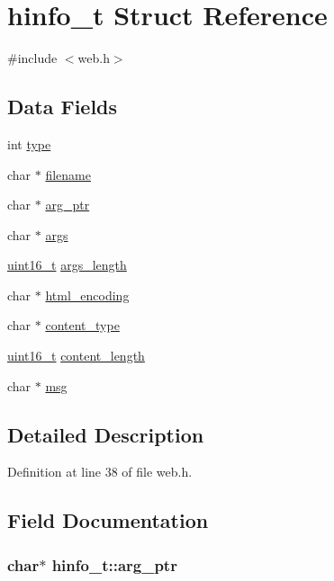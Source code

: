 \hypertarget{structhinfo__t}{\section{hinfo\-\_\-t Struct Reference}
\label{structhinfo__t}
}


{\ttfamily \#include $<$web.\-h$>$}

\subsection*{Data Fields}
\begin{DoxyCompactItemize}
\item 
int \hyperlink{structhinfo__t_a4e896141431943909a71282fc56799fb}{type}
\item 
char $\ast$ \hyperlink{structhinfo__t_a874ffdf5ade4e3844d7719444495e89c}{filename}
\item 
char $\ast$ \hyperlink{structhinfo__t_a0d27c1b7d2730373f93342961b9cb18d}{arg\-\_\-ptr}
\item 
char $\ast$ \hyperlink{structhinfo__t_a62bf198b939a9d932bcac763ebc51443}{args}
\item 
\hyperlink{send_8c_a273cf69d639a59973b6019625df33e30}{uint16\-\_\-t} \hyperlink{structhinfo__t_a003130c9489dfe54a76df23a85fae62f}{args\-\_\-length}
\item 
char $\ast$ \hyperlink{structhinfo__t_ac03bcdde52e49a14bf9112f295f216b5}{html\-\_\-encoding}
\item 
char $\ast$ \hyperlink{structhinfo__t_a87bad5ce6af7ed3613a61d01aef94d8d}{content\-\_\-type}
\item 
\hyperlink{send_8c_a273cf69d639a59973b6019625df33e30}{uint16\-\_\-t} \hyperlink{structhinfo__t_a6cf5714c0fe8e8e7f7819194274f9052}{content\-\_\-length}
\item 
char $\ast$ \hyperlink{structhinfo__t_a06469570091ad74724457998e07d5b56}{msg}
\end{DoxyCompactItemize}


\subsection{Detailed Description}


Definition at line 38 of file web.\-h.



\subsection{Field Documentation}
\hypertarget{structhinfo__t_a0d27c1b7d2730373f93342961b9cb18d}{
\subsubsection[{arg\-\_\-ptr}]{\setlength{\rightskip}{0pt plus 5cm}char$\ast$ hinfo\-\_\-t\-::arg\-\_\-ptr}}\label{structhinfo__t_a0d27c1b7d2730373f93342961b9cb18d}


